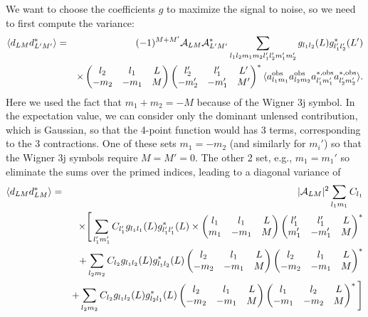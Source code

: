 \documentclass[prd,amsmath,amssymb,floatfix,superscriptaddress,nofootinbib,preprintnumbers]{revtex4-1}
\def\bea{\begin{eqnarray}}
\def\eea{\end{eqnarray}}
\newcommand{\vs}{\nonumber\\}
\begin{document}
 We want to choose the coefficients $g$ to maximize the signal to noise, so we need to first compute the variance:
 \bea
 \langle d_{LM} d^*_{L'M'} \rangle &=& (-1)^{M+M'}  \mathcal{A}_{LM}\mathcal{A}^*_{L'M'} \sum_{l_1l_2m_1m_2 l_1'l_2'm_1'm_2'} g_{l_1l_2}(L)  g^*_{l_1'l_2'}(L') \vs
 &&\times \left(\begin{matrix} l_2 & l_1 &L\cr -m_2&-m_1&M\end{matrix}\right)
 \left(\begin{matrix} l_2' & l_1' &L'\cr -m_2'&-m_1'&M'\end{matrix}\right)^*
 \langle a^{\rm obs}_{l_1m_1} a^{\rm obs}_{l_2m_2}  a^{*,\rm obs}_{l_1'm_1'} a^{*,\rm obs}_{l_2'm_2'} \rangle.
 \eea
 Here we used the fact that $m_1+m_2=-M$ because of the Wigner 3j symbol. In the expectation value, we can consider only the dominant unlensed contribution, which is Gaussian, so that the 4-point function would has 3 terms, corresponding to the 3 contractions. One of these sets $m_1=-m_2$ (and similarly for $m_i'$) so that the Wigner 3j symbols require $M=M'=0$. The other 2 set, e.g., $m_1=m_1'$ so eliminate the sums over the primed indices, leading to a diagonal variance of
 \bea
 \langle d_{LM} d^*_{LM} \rangle &=& \vert \mathcal{A}_{LM}\vert^2
 \sum_{l_1m_1} C_{l_1}
 \vs
 &&\times 
\Bigg[ \sum_{ l_1'm_1'}  C_{l_1'} g_{l_1l_1}(L)  g^*_{l_1'l_1'}(L) 
\times \left(\begin{matrix} l_1 & l_1 &L\cr m_1&-m_1&M\end{matrix}\right)
 \left(\begin{matrix} l_1' & l_1' &L\cr m_1'&-m_1'&M\end{matrix}\right)^*\vs
 &&+ \sum_{l_2m_2}  C_{l_2}  g_{l_1l_2}(L)  g^*_{l_1l_2}(L)  \left(\begin{matrix} l_2 & l_1 &L\cr -m_2&-m_1&M\end{matrix}\right)
 \left(\begin{matrix} l_2 & l_1 &L\cr -m_2&-m_1&M\end{matrix}\right)^* 
 \vs
 &&+ \sum_{l_2m_2}  C_{l_2} g_{l_1l_2}(L)  g^*_{l_2l_1}(L)  \left(\begin{matrix} l_2 & l_1 &L\cr -m_2&-m_1&M\end{matrix}\right)
 \left(\begin{matrix} l_1 & l_2 &L\cr -m_1&-m_2&M\end{matrix}\right)^* 
 \Bigg]
  \eea 

\end{document}
